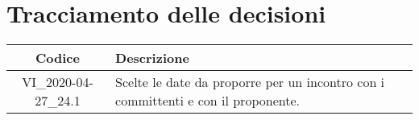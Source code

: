 \section*{Tracciamento delle decisioni}

\begin{center}
	\begin{longtable}{|c|p{12.25cm}|}
		\hline
		\rowcolor{lighter-grayer}
		\textbf{Codice} & \textbf{Descrizione} \\
		\hline
		\endfirsthead

		\hline
		VI\_2020-04-27\_24.1 & Scelte le date da proporre per un incontro con i committenti e con il proponente. \\
		\hline

	\end{longtable}
\end{center}
